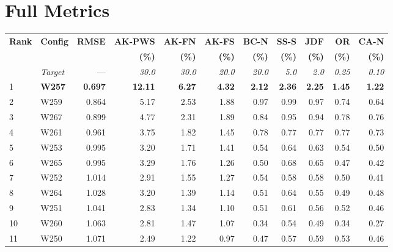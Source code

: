 \documentclass[11pt,a4paper,oneside]{article}
\begin{document}
\clearpage

\appendix
\section{Full Metrics}
\label{app:metrics}

\begin{table}[H]
\centering
\footnotesize
\setlength{\tabcolsep}{3pt}
\begin{tabular}{ll r rrrrrrrr}
\toprule
\textbf{Rank} & \textbf{Config} & \textbf{RMSE} & \textbf{AK-PWS} & \textbf{AK-FN} & \textbf{AK-FS} & \textbf{BC-N} & \textbf{SS-S} & \textbf{JDF} & \textbf{OR} & \textbf{CA-N} \\
 & & & \textbf{(\%)} & \textbf{(\%)} & \textbf{(\%)} & \textbf{(\%)} & \textbf{(\%)} & \textbf{(\%)} & \textbf{(\%)} & \textbf{(\%)} \\
\midrule
& \textit{Target} & --- & \textit{30.0} & \textit{30.0} & \textit{20.0} & \textit{20.0} & \textit{5.0} & \textit{2.0} & \textit{0.25} & \textit{0.10} \\
\midrule
1  & \textbf{W257} & \textbf{0.697} & \textbf{12.11} & \textbf{6.27} & \textbf{4.32} & \textbf{2.12} & \textbf{2.36} & \textbf{2.25} & \textbf{1.45} & \textbf{1.22} \\
2  & W259 & 0.864 & 5.17 & 2.53 & 1.88 & 0.97 & 0.99 & 0.97 & 0.74 & 0.64 \\
3  & W267 & 0.899 & 4.77 & 2.31 & 1.89 & 0.84 & 0.95 & 0.94 & 0.78 & 0.76 \\
4  & W261 & 0.961 & 3.75 & 1.82 & 1.45 & 0.78 & 0.77 & 0.77 & 0.77 & 0.73 \\
5  & W253 & 0.995 & 3.20 & 1.71 & 1.41 & 0.54 & 0.64 & 0.63 & 0.54 & 0.50 \\
6  & W265 & 0.995 & 3.29 & 1.76 & 1.26 & 0.50 & 0.68 & 0.65 & 0.47 & 0.42 \\
7  & W252 & 1.014 & 2.91 & 1.55 & 1.27 & 0.54 & 0.58 & 0.58 & 0.50 & 0.41 \\
8  & W264 & 1.028 & 3.20 & 1.39 & 1.14 & 0.51 & 0.64 & 0.55 & 0.49 & 0.48 \\
9  & W251 & 1.041 & 2.83 & 1.34 & 1.10 & 0.51 & 0.61 & 0.56 & 0.52 & 0.46 \\
10 & W260 & 1.063 & 2.81 & 1.47 & 1.07 & 0.34 & 0.54 & 0.49 & 0.34 & 0.27 \\
11 & W250 & 1.071 & 2.49 & 1.22 & 0.97 & 0.47 & 0.57 & 0.59 & 0.53 & 0.46 \\

\end{tabular}
\end{table}
\end{document}
